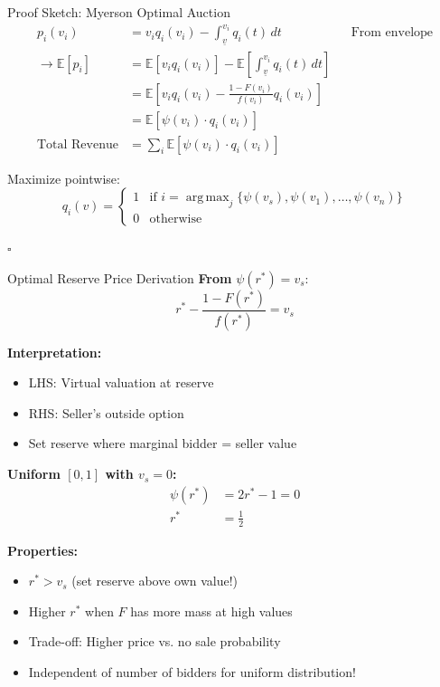 \documentclass[xcolor={x11names}, aspectratio=169 ]{beamer}
\DeclareMathOperator*{\argmax}{arg\,max}
\newcommand{\E}{\mathbb{E}}
\begin{document}
\begin{frame}{Proof Sketch: Myerson Optimal Auction}
\begin{align*}
p_i(v_i) &= v_i q_i(v_i) - \int_{\underline{v}}^{v_i} q_i(t) \, dt && \text{From envelope} \\
\rightarrow \E[p_i] &= \E[v_i q_i(v_i)] - \E\left[\int_{\underline{v}}^{v_i} q_i(t) \, dt\right] && \\
&= \E\left[v_i q_i(v_i) - \frac{1-F(v_i)}{f(v_i)} q_i(v_i)\right] &&\\
&= \E[\psi(v_i) \cdot q_i(v_i)] && \\
\text{Total Revenue} &= \sum_i \E[\psi(v_i) \cdot q_i(v_i)] &&
\end{align*}

Maximize pointwise:
$$q_i(v) = \begin{cases} 1 & \text{if } i = \argmax_j \{\psi(v_s), \psi(v_1), \ldots, \psi(v_n)\} \\ 0 & \text{otherwise} \end{cases}$$

$\square$
\end{frame}

\begin{frame}{Optimal Reserve Price Derivation}
\textbf{From } $\psi(r^*) = v_s$:
$$r^* - \frac{1-F(r^*)}{f(r^*)} = v_s$$

\textbf{Interpretation:}
\begin{itemize}
  \item LHS: Virtual valuation at reserve
  \item RHS: Seller's outside option
  \item Set reserve where marginal bidder = seller value
\end{itemize}

\textbf{Uniform $[0,1]$ with $v_s = 0$:}
\begin{align*}
\psi(r^*) &= 2r^* - 1 = 0 \\
r^* &= \frac{1}{2}
\end{align*}

\textbf{Properties:}
\begin{itemize}
  \item $r^* > v_s$ (set reserve above own value!)
  \item Higher $r^*$ when $F$ has more mass at high values
  \item Trade-off: Higher price vs. no sale probability
  \item Independent of number of bidders for uniform distribution!
\end{itemize}
\end{frame}
\end{document}
